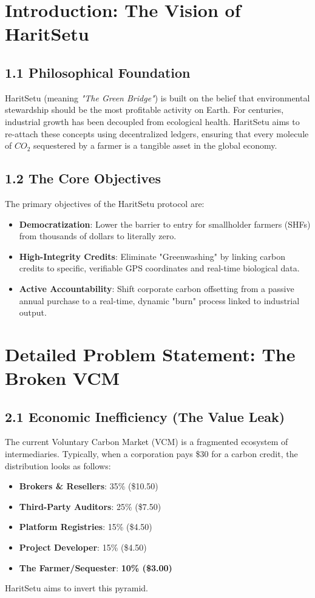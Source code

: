 \documentclass[11pt,a4paper]{article}
\begin{document}
\newpage
\tableofcontents
\newpage

\section{Introduction: The Vision of HaritSetu}
\subsection{1.1 Philosophical Foundation}
HaritSetu (meaning \textit{"The Green Bridge"}) is built on the belief that environmental stewardship should be the most profitable activity on Earth. For centuries, industrial growth has been decoupled from ecological health. HaritSetu aims to re-attach these concepts using decentralized ledgers, ensuring that every molecule of $CO_2$ sequestered by a farmer is a tangible asset in the global economy.

\subsection{1.2 The Core Objectives}
The primary objectives of the HaritSetu protocol are:
\begin{itemize}
    \item \textbf{Democratization}: Lower the barrier to entry for smallholder farmers (SHFs) from thousands of dollars to literally zero.
    \item \textbf{High-Integrity Credits}: Eliminate "Greenwashing" by linking carbon credits to specific, verifiable GPS coordinates and real-time biological data.
    \item \textbf{Active Accountability}: Shift corporate carbon offsetting from a passive annual purchase to a real-time, dynamic "burn" process linked to industrial output.
\end{itemize}

\section{Detailed Problem Statement: The Broken VCM}
\subsection{2.1 Economic Inefficiency (The Value Leak)}
The current Voluntary Carbon Market (VCM) is a fragmented ecosystem of intermediaries. Typically, when a corporation pays \$30 for a carbon credit, the distribution looks as follows:
\begin{itemize}
    \item \textbf{Brokers \& Resellers}: 35\% (\$10.50)
    \item \textbf{Third-Party Auditors}: 25\% (\$7.50)
    \item \textbf{Platform Registries}: 15\% (\$4.50)
    \item \textbf{Project Developer}: 15\% (\$4.50)
    \item \textbf{The Farmer/Sequester}: \textbf{10\% (\$3.00)}
\end{itemize}
HaritSetu aims to invert this pyramid.
\end{document}
